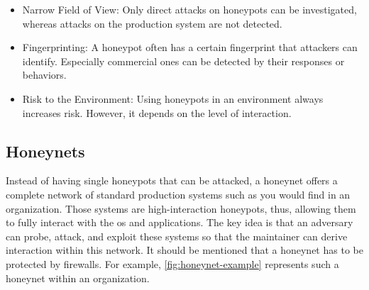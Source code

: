 \begin{itemize}
    \item Narrow Field of View: Only direct attacks on honeypots can be investigated, whereas attacks on the production system are not detected.
    \item Fingerprinting: A honeypot often has a certain fingerprint that attackers can identify.
          Especially commercial ones can be detected by their responses or behaviors.
    \item Risk to the Environment: Using honeypots in an environment always increases risk.
          However, it depends on the level of interaction.
\end{itemize}

\subsection{Honeynets}

Instead of having single honeypots that can be attacked, a honeynet offers a complete network of standard production systems such as you would find in an organization.
Those systems are high-interaction honeypots, thus, allowing them to fully interact with the \ac{os} and applications.
The key idea is that an adversary can probe, attack, and exploit these systems so that the maintainer can derive interaction within this network.
It should be mentioned that a honeynet has to be protected by firewalls.
For example, \autoref{fig:honeynet-example} represents such a honeynet within an organization.


